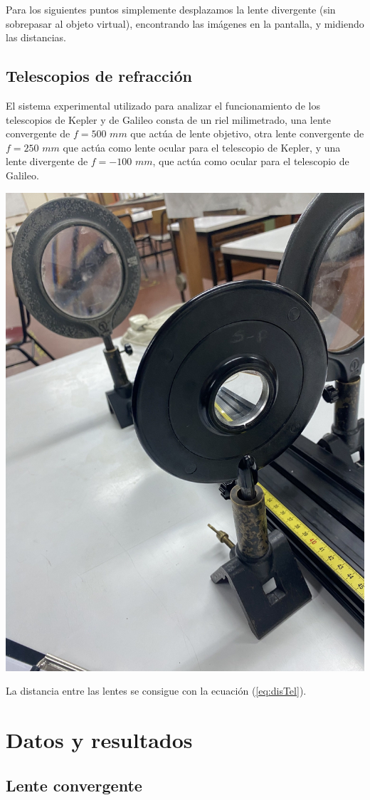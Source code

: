 \documentclass[a4paper,12pt]{article}
\newenvironment{Figure}
  {\par\medskip\noindent\minipage{\linewidth}}
  {\endminipage\par\medskip}
\begin{document}
\begin{multicols*}{2}
        Para los siguientes puntos simplemente desplazamos la lente divergente (sin sobrepasar al objeto virtual), encontrando las imágenes en la pantalla, y midiendo las distancias.

    \subsection*{Telescopios de refracción}

        El sistema experimental utilizado para analizar el funcionamiento de los telescopios de Kepler y de Galileo consta de un riel milimetrado, una lente convergente de $f=500$ $mm$ que actúa de lente objetivo, otra lente convergente de $f=250$ $mm$ que actúa como lente ocular para el telescopio de Kepler, y una lente divergente de $f=-100$ $mm$, que actúa como ocular para el telescopio de Galileo.

        \begin{Figure}
            \centering
            \includegraphics[width=0.55\linewidth]{SistTelRR.jpg}
            \label{f: Tel}
        \end{Figure}

        La distancia entre las lentes se consigue con la ecuación (\ref{eq:disTel}).

\section*{Datos y resultados}

    \subsection*{Lente convergente}


\end{multicols*}
\end{document}

